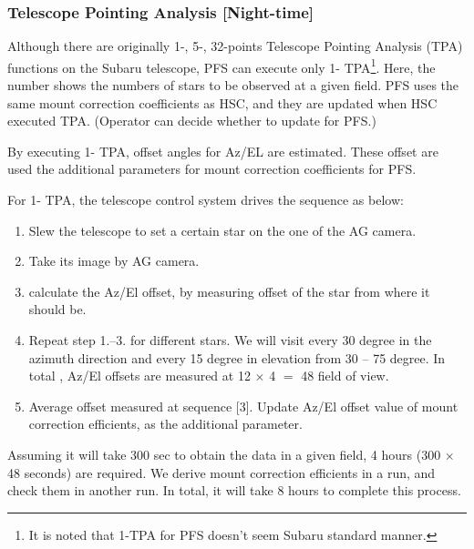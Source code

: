 \subsubsection{Telescope Pointing Analysis [Night-time]}\label{secflow:TPA1}


Although there are originally 1-, 5-, 32-points Telescope Pointing Analysis (TPA) functions on the Subaru telescope, PFS can execute only 1- TPA\footnote{It is noted that 1-TPA for PFS doesn't seem Subaru standard manner.}.
Here, the number shows the numbers of stars to be observed at a given field.
PFS uses the same mount correction coefficients as HSC, and they are updated when HSC executed TPA.
(Operator can decide whether to update for PFS.)

By executing 1- TPA, offset angles for Az/EL are estimated.
These offset are used the additional parameters for mount correction coefficients for PFS.

For 1- TPA, the telescope control system drives the sequence as below:
\begin{enumerate}
\item Slew the telescope to set a certain star on the one of the AG camera.
\item Take its image by AG camera.
\item calculate the Az/El offset, by measuring offset of the star from where it should be.
\item Repeat step 1.--3. for different stars.
We will visit every 30 degree in the azimuth direction and every 15 degree in elevation from 30 -- 75 degree.
In total , Az/El offsets are  measured at 12 $\times$ 4 $=$ 48 field of view.
\item Average offset measured at sequence [3].
Update Az/El offset value of mount correction efficients, as the additional parameter.
\end{enumerate}

Assuming it will take 300 sec to obtain the data in a given field, 4 hours (300 $\times$ 48 seconds) are required.
We derive mount correction efficients in a run, and check them in another run.
In total, it will take 8 hours to complete this process.

